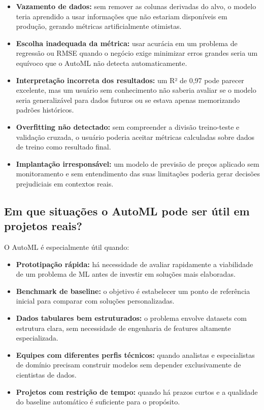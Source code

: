 \documentclass[11pt, a4paper, oneside]{article}
\begin{document}
\begin{itemize}[leftmargin=1.5cm, itemsep=4pt]
  \item \textbf{Vazamento de dados:} sem remover as colunas derivadas do alvo, o modelo teria aprendido a usar informações que não estariam disponíveis em produção, gerando métricas artificialmente otimistas.
  \item \textbf{Escolha inadequada da métrica:} usar acurácia em um problema de regressão ou RMSE quando o negócio exige minimizar erros grandes seria um equívoco que o AutoML não detecta automaticamente.
  \item \textbf{Interpretação incorreta dos resultados:} um R² de 0,97 pode parecer excelente, mas um usuário sem conhecimento não saberia avaliar se o modelo seria generalizável para dados futuros ou se estava apenas memorizando padrões históricos.
  \item \textbf{Overfitting não detectado:} sem compreender a divisão treino-teste e validação cruzada, o usuário poderia aceitar métricas calculadas sobre dados de treino como resultado final.
  \item \textbf{Implantação irresponsável:} um modelo de previsão de preços aplicado sem monitoramento e sem entendimento das suas limitações poderia gerar decisões prejudiciais em contextos reais.
\end{itemize}

\subsection{Em que situações o AutoML pode ser útil em projetos reais?}
\label{sec:util}

O AutoML é especialmente útil quando:

\begin{itemize}[leftmargin=1.5cm, itemsep=4pt]
  \item \textbf{Prototipação rápida:} há necessidade de avaliar rapidamente a viabilidade de um problema de ML antes de investir em soluções mais elaboradas.
  \item \textbf{Benchmark de baseline:} o objetivo é estabelecer um ponto de referência inicial para comparar com soluções personalizadas.
  \item \textbf{Dados tabulares bem estruturados:} o problema envolve datasets com estrutura clara, sem necessidade de engenharia de features altamente especializada.
  \item \textbf{Equipes com diferentes perfis técnicos:} quando analistas e especialistas de domínio precisam construir modelos sem depender exclusivamente de cientistas de dados.
  \item \textbf{Projetos com restrição de tempo:} quando há prazos curtos e a qualidade do baseline automático é suficiente para o propósito.
\end{itemize}
\end{document}
